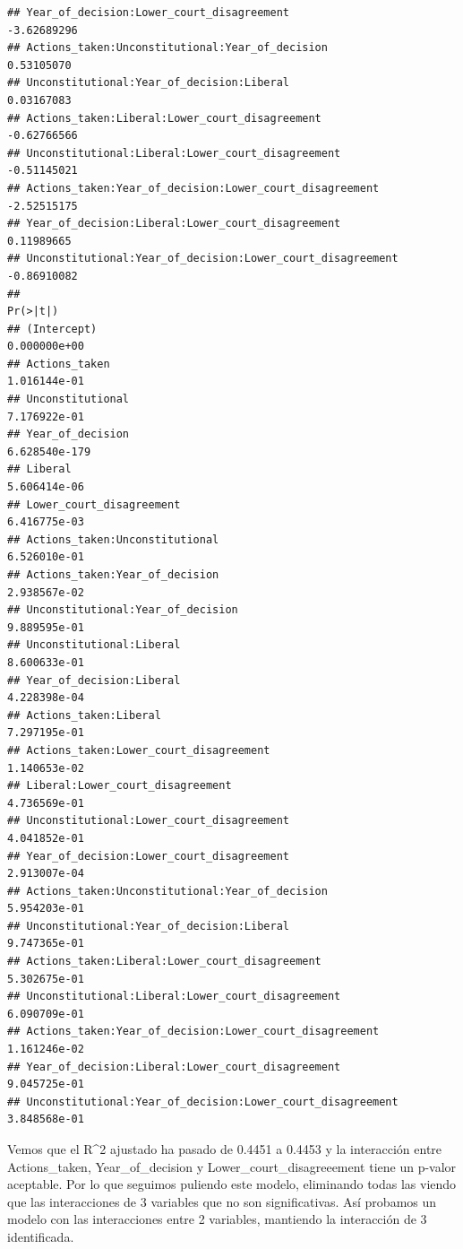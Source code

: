 \documentclass[
]{article}
\begin{document}
\begin{verbatim}
## Year_of_decision:Lower_court_disagreement                   -3.62689296
## Actions_taken:Unconstitutional:Year_of_decision              0.53105070
## Unconstitutional:Year_of_decision:Liberal                    0.03167083
## Actions_taken:Liberal:Lower_court_disagreement              -0.62766566
## Unconstitutional:Liberal:Lower_court_disagreement           -0.51145021
## Actions_taken:Year_of_decision:Lower_court_disagreement     -2.52515175
## Year_of_decision:Liberal:Lower_court_disagreement            0.11989665
## Unconstitutional:Year_of_decision:Lower_court_disagreement  -0.86910082
##                                                                 Pr(>|t|)
## (Intercept)                                                 0.000000e+00
## Actions_taken                                               1.016144e-01
## Unconstitutional                                            7.176922e-01
## Year_of_decision                                           6.628540e-179
## Liberal                                                     5.606414e-06
## Lower_court_disagreement                                    6.416775e-03
## Actions_taken:Unconstitutional                              6.526010e-01
## Actions_taken:Year_of_decision                              2.938567e-02
## Unconstitutional:Year_of_decision                           9.889595e-01
## Unconstitutional:Liberal                                    8.600633e-01
## Year_of_decision:Liberal                                    4.228398e-04
## Actions_taken:Liberal                                       7.297195e-01
## Actions_taken:Lower_court_disagreement                      1.140653e-02
## Liberal:Lower_court_disagreement                            4.736569e-01
## Unconstitutional:Lower_court_disagreement                   4.041852e-01
## Year_of_decision:Lower_court_disagreement                   2.913007e-04
## Actions_taken:Unconstitutional:Year_of_decision             5.954203e-01
## Unconstitutional:Year_of_decision:Liberal                   9.747365e-01
## Actions_taken:Liberal:Lower_court_disagreement              5.302675e-01
## Unconstitutional:Liberal:Lower_court_disagreement           6.090709e-01
## Actions_taken:Year_of_decision:Lower_court_disagreement     1.161246e-02
## Year_of_decision:Liberal:Lower_court_disagreement           9.045725e-01
## Unconstitutional:Year_of_decision:Lower_court_disagreement  3.848568e-01
\end{verbatim}

Vemos que el R\^{}2 ajustado ha pasado de 0.4451 a 0.4453 y la
interacción entre Actions\_taken, Year\_of\_decision y
Lower\_court\_disagreeement tiene un p-valor aceptable. Por lo que
seguimos puliendo este modelo, eliminando todas las viendo que las
interacciones de 3 variables que no son significativas. Así probamos un
modelo con las interacciones entre 2 variables, mantiendo la interacción
de 3 identificada.
\end{document}
